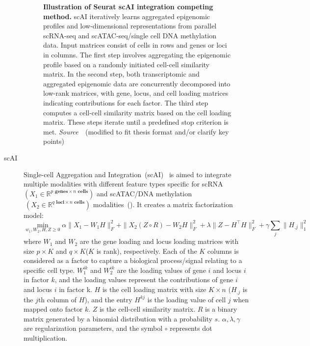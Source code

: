 \begin{description}
\begin{figure}[!h]
  	\vspace{0.1cm}
  	\caption[Illustration of Seurat scAI integration competing method.]{\textbf{Illustration of Seurat scAI integration competing method.} scAI iteratively learns aggregated epigenomic profiles and low-dimensional representations from parallel scRNA-seq and scATAC-seq/single cell DNA methylation data. Input matrices consist of cells in rows and genes or loci in columns. The first step involves aggregating the epigenomic profile based on a randomly initiated cell-cell similarity matrix. In the second step, both transcriptomic and aggregated epigenomic data are concurrently decomposed into low-rank matrices, with gene, locus, and cell loading matrices indicating contributions for each factor. The third step computes a cell-cell similarity matrix based on the cell loading matrix. These steps iterate until a predefined stop criterion is met. \emph{Source~\cite{jin2020scai}}~(modified to fit thesis format and/or clarify key points)
  }
  	\label{fig:Alg_scAI}
\end{figure}

  \item[scAI]
  Single-cell Aggregation and Integration~(scAI)~\citep{jin2020scai} is aimed to integrate multiple modalities with different feature types specific for scRNA $(X_1\in \mathbb{R}^{p \textbf{ genes} \times n \textbf{ cells}})$ and scATAC/DNA methylation$~(X_2\in \mathbb{R}^{q \textbf{ loci}\times n \textbf{ cells}})$ modalities~(). It creates a matrix factorization model:
  \begin{equation}
  \min_{w_1,W_2,H,Z\geq 0} \alpha \|X_1-W_1H\|_F^2 + \|X_2(Z \circ R)-W_2H\|_F^2 + \lambda \|Z-H^\top H\|_F^2 + \gamma\sum_j \|H_{.j}\|_1^2
  \end{equation}
  where $W_1$ and $W_2$ are the gene loading and locus loading matrices with size $p\times K$ and $q\times K$($K$ is rank), respectively. Each of the $K$ columns is considered as a factor to capture a biological process/signal relating to a specific cell type. $W_1^{ik}$ and $W_2^{ik}$ are the loading values of gene $i$ and locus $i$ in factor $k$, and the loading values represent the contributions of gene $i$ and locus $i$ in factor k. $H$ is the cell loading matrix with size $K\times n$ ($H_{.j}$ is the $j$th column of $H$), and the entry $H^{kj}$ is the loading value of cell $j$ when mapped onto factor $k$. $Z$ is the cell-cell similarity matrix. $R$ is a binary matrix generated by a binomial distribution with a probability $s$. $\alpha, \lambda, \gamma$ are regularization parameters, and the symbol $\circ$ represents dot multiplication.



\end{description}
